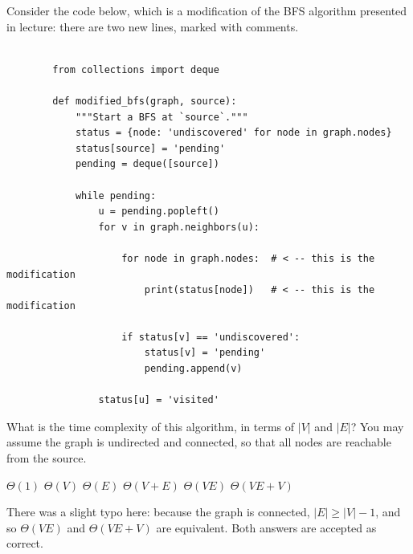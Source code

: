\Needspace{7in}
\begin{prob}

    Consider the code below, which is a modification of the BFS algorithm
    presented in lecture: there are two new lines, marked with comments.

    \begin{verbatim}

        from collections import deque

        def modified_bfs(graph, source):
            """Start a BFS at `source`."""
            status = {node: 'undiscovered' for node in graph.nodes}
            status[source] = 'pending'
            pending = deque([source])

            while pending:
                u = pending.popleft()
                for v in graph.neighbors(u):

                    for node in graph.nodes:  # < -- this is the modification
                        print(status[node])   # < -- this is the modification

                    if status[v] == 'undiscovered':
                        status[v] = 'pending'
                        pending.append(v)

                status[u] = 'visited'
    \end{verbatim}

    What is the time complexity of this algorithm, in terms of $|V|$ and $|E|$?
    You may assume the graph is undirected and connected, so that all nodes are
    reachable from the source.

    \begin{choices}
        \choice $\Theta(1)$
        \choice $\Theta(V)$
        \choice $\Theta(E)$
        \choice $\Theta(V + E)$
        \correctchoice $\Theta(V E)$
        \correctchoice $\Theta(V E + V)$
    \end{choices}

    \begin{soln}
        There was a slight typo here: because the graph is connected, $|E| \geq |V| - 1$, and so $\Theta(VE)$ and $\Theta(VE + V)$ are equivalent. Both answers are accepted as correct.
    \end{soln}

\end{prob}
